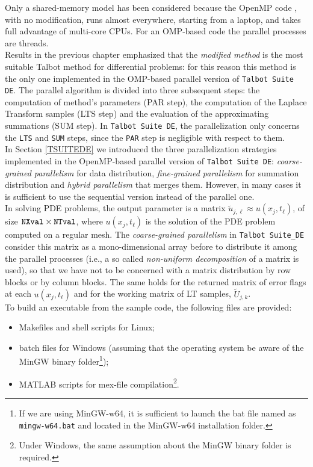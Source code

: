 \documentclass[a4paper,10pt]{report}%
\begin{document}
Only a shared-memory model has been considered because the OpenMP code \cite{OMP:URL}, with no modification,
runs almost everywhere, starting from a laptop, and takes full advantage of multi-core CPUs.
For an OMP-based code the parallel processes are threads.
\\
Results in the previous chapter emphasized that the {\em modified method} is the most suitable Talbot method for
differential problems: for this reason this method is the only one implemented in the OMP-based parallel version
of {\tt Talbot Suite DE}.
The parallel algorithm is divided into three subsequent steps: the computation of method's parameters (PAR step),
the computation of the Laplace Transform samples (LTS step) and the evaluation of the approximating summations
(SUM step).
In {\tt Talbot Suite DE}, the parallelization only concerns the {\tt LTS} and {\tt SUM} steps, since the {\tt PAR}
step is negligible with respect to them.
\\
In Section \ref{TSUITEDE} we introduced the three parallelization strategies implemented in the OpenMP-based
parallel version of {\tt Talbot Suite DE}: {\em coarse-grained parallelism} for data distribution,
{\em fine-grained parallelism} for summation distribution and {\em hybrid parallelism} that merges them.
However, in many cases it is sufficient to use the sequential version instead of the parallel one.
\\
In solving PDE problems, the output parameter is a matrix $\widetilde{u}_{j,\ell}\approx u(x_j,t_\ell)$, of size
${\tt NXval}\times{\tt NTval}$, where $u(x_j,t_\ell)$ is the solution of the PDE problem computed on a regular mesh.
The {\em coarse-grained parallelism} in {\tt Talbot Suite\_DE} consider this matrix as a mono-dimensional array
before to distribute it among the parallel processes (i.e., a so called {\em non-uniform decomposition} of a matrix
is used), so that we have not to be concerned with a matrix distribution by row blocks or by column blocks. The same
holds for the returned matrix of error flags at each $u(x_j,t_\ell)$ and for the working matrix of LT samples,
$\widetilde{U}_{j,k}$.
\\[.15in]
To build an executable from the sample code, the following files are provided:
\begin{itemize}
\item Makefiles and shell scripts for Linux;
\item batch files for Windows (assuming that the operating system be aware of the MinGW binary
folder\footnote{ If we are using MinGW-w64, it is sufficient to launch the bat file named as
{\tt mingw-w64.bat} and located in the MinGW-w64 installation folder.});
\item MATLAB scripts for mex-file compilation\footnote{ Under Windows, the same assumption about the MinGW binary folder is required.}.
\end{itemize}
\end{document}
